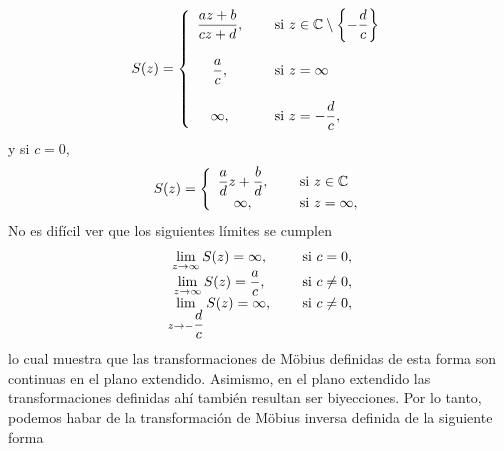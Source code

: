 \[
	S(z)=\left\{ \begin{array}{ccl}
		\dfrac{az+b}{cz+d},& &\mbox{ si } z\in \mathbb{C}\setminus\left\{-\dfrac{d}{c}\right\}\\\\
		\dfrac{a}{c},& &\mbox{ si } z=\infty\\\\
		\infty,& &\mbox{ si } z=-\dfrac{d}{c},
	\end{array} \right.
\]
y si $c=0$, 
\[
S(z)=\left\{ \begin{array}{ccl}
	\dfrac{a}{d}z+\dfrac{b}{d},& &\mbox{ si } z\in \mathbb{C}\\
	\infty,& &\mbox{ si } z=\infty,
\end{array} \right.
\]
No es difícil ver que los siguientes límites se cumplen
\[
\begin{array}{ccl}
	\displaystyle\lim_{z\rightarrow\infty}S(z)= \infty,&&\mbox{ si } c=0,\\
	\displaystyle\lim_{z\rightarrow\infty}S(z)= \dfrac{a}{c},&&\mbox{ si } c\neq0,\\
	\displaystyle\lim_{z\rightarrow -\dfrac{d}{c}}S(z)= \infty,&&\mbox{ si } c\neq 0,
\end{array}
\] 
lo cual muestra que las transformaciones de M\"obius definidas de esta forma son continuas en el plano extendido. Asimismo, en el plano extendido las transformaciones definidas ahí también resultan ser biyecciones. Por lo tanto, podemos habar de la transformación de M\"obius inversa
definida de la siguiente forma

